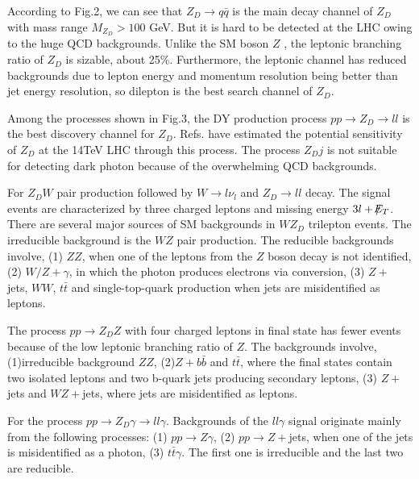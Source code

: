 \documentclass{article}
\begin{document}
According to Fig.2, we can see that  $Z_D\rightarrow q\bar{q}$ is the main decay channel of $Z_D$ with mass range $M_{Z_D}>100$ GeV. But it is hard to be detected at the LHC owing to the huge QCD backgrounds. Unlike the SM boson $Z$ , the leptonic branching ratio of $Z_D$ is  sizable, about 25\%. Furthermore, the leptonic channel has reduced backgrounds due to lepton energy and momentum resolution being better than jet energy resolution, so dilepton is the best search channel of $Z_D$.

 Among the  processes shown in Fig.3, the DY production process $pp\rightarrow Z_D\rightarrow ll$  is the best  discovery channel for $Z_D$. Refs.\cite{1408.1075,1412.0018} have estimated the potential sensitivity of $Z_D$ at the 14TeV LHC through this process. The process $Z_Dj$ is not suitable for detecting dark photon because of the overwhelming QCD backgrounds.

For $Z_DW$ pair production followed by $W\rightarrow l \nu_l$ and $Z_D\rightarrow ll$ decay. The signal events are characterized by three charged leptons and missing energy $3l+/\kern-0.65em E_T$. There are several major sources of SM backgrounds in $WZ_D$ trilepton events. The irreducible background is the  $WZ$ pair production. The reducible backgrounds involve, (1) $ZZ$, when one of the leptons from the $Z$ boson decay is not identified, (2) $W/Z+\gamma$, in which the photon produces  electrons via conversion, (3) $Z+$ jets, $WW$, $t\bar{t}$ and single-top-quark production when jets are misidentified as leptons.

The process $pp\rightarrow Z_DZ$ with four charged leptons in final state  has fewer events because of the low leptonic branching ratio of $Z$. The backgrounds involve, (1)irreducible background $ZZ$, (2)$Z+b\bar{b}$ and $t\bar{t}$, where the final states contain two isolated leptons and two b-quark jets producing secondary leptons, (3) $Z+$ jets and $WZ+$jets, where jets are misidentified as leptons.

For the process $pp\rightarrow Z_D\gamma\rightarrow ll\gamma$. Backgrounds of the $ll\gamma$ signal originate mainly from the following processes: (1) $pp\rightarrow Z\gamma$, (2) $pp\rightarrow Z+$jets, when one of the jets is misidentified as a photon, (3) $t\bar{t}\gamma$. The first one is irreducible and the last two are reducible.
\end{document}

